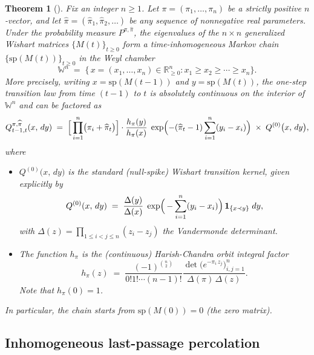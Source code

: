 \documentclass[letterpaper,11pt,oneside,reqno]{article}
\numberwithin{equation}{section}
\newtheorem{theorem}[proposition]{Theorem}
\theoremstyle{definition}
\begin{document}
\begin{theorem}[\cite{dieker2008largest}]
\label{thm:MarkovChain}
Fix an integer \(n\ge1\).  Let \(\pi=(\pi_1,\dots,\pi_n)\) be a strictly positive \(n\)-vector, and let \(\widehat\pi=(\widehat\pi_1,\widehat\pi_2,\dots)\) be any sequence of nonnegative real parameters.  Under the probability measure \(P^{\pi,\widehat\pi}\), the eigenvalues of the \(n\times n\) generalized Wishart matrices \(\{M(t)\}_{t\ge0}\) form a time-inhomogeneous Markov chain \(\{\mathrm{sp}(M(t))\}_{t\ge0}\) in the Weyl chamber
\[
\mathbb{W}^n
\;=\;
\bigl\{\,x=(x_1,\dots,x_n)\in\mathbb{R}^n_{\ge0}:
x_1\ge x_2\ge\cdots\ge x_n\bigr\}.
\]
More precisely, writing \(x=\mathrm{sp}(M(t-1))\) and \(y=\mathrm{sp}(M(t))\), the one-step transition law from time \((t-1)\) to \(t\) is absolutely continuous on the interior of \(\mathbb{W}^n\) and can be factored as
\begin{equation}
\label{eq:transition-density}
Q_{t-1,t}^{\pi,\widehat\pi}(x,\,dy)
\;=\;
\Bigl[\,
\prod_{i=1}^n \bigl(\pi_i+\widehat\pi_{t}\bigr)
\Bigr]
\cdot
\frac{h_{\pi}(y)}{h_{\pi}(x)}
\;\exp\Bigl(-(\widehat\pi_{t}-1)\sum_{i=1}^n (y_i - x_i)\Bigr)
\;\times\;Q^{(0)}\bigl(x,\,dy\bigr),
\end{equation}
where
\begin{itemize}
\item \(\displaystyle Q^{(0)}\bigl(x,\,dy\bigr)\) is the \emph{standard} (null-spike) Wishart transition kernel, given explicitly by
	\begin{equation}
		\label{eq:Q0}
Q^{(0)}(x,\,dy)
\;=\;
\frac{\Delta(y)}{\Delta(x)}\;\exp\Bigl(\,-\sum_{i=1}^n (y_i - x_i)\Bigr)\,
\mathbf{1}_{\{x\prec y\}}\;dy,
\end{equation}
with \(\Delta(z)=\prod_{1\le i<j\le n}(z_i - z_j)\) the Vandermonde determinant.

\item The function \(h_{\pi}\) is the (continuous) Harish-Chandra orbit integral factor
\[
h_{\pi}(z)
\;=\;
\frac{(-1)^{\binom n2}}{0! 1! \cdots (n-1)! }
\frac{\det\bigl(e^{-\pi_i\,z_j}\bigr)_{i,j=1}^n}{\Delta(\pi)\,\Delta(z)}.
\]
Note that $h_\pi(0)=1$.
\end{itemize}
In particular, the chain starts from \(\mathrm{sp}(M(0))=0\) (the zero matrix).
\end{theorem}




\subsection{Inhomogeneous last-passage percolation}
\end{document}
